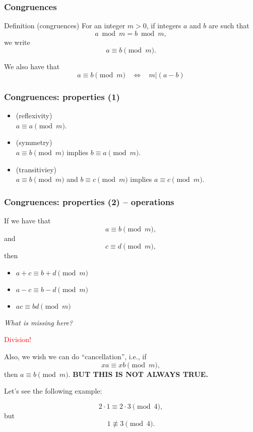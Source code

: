 \begin{frame}
  \frametitle{Congruences}

  \begin{block}{Definition (congruences)}
    For an integer $m>0$,
    if integers $a$ and $b$ are such that
    \[
    a \bmod m = b \bmod m,
    \]
    we write
    \[
    a \equiv b \pmod m.
    \]
  \end{block}

  \pause

  We also have that
  \[
  a \equiv b \pmod m \ \ \ \ \Leftrightarrow \ \ \ \
  m|(a-b)
  \]
\end{frame}

\begin{frame}
  \frametitle{Congruences: properties (1)}

  \begin{itemize}
  \item (reflexivity) \\
    $a\equiv a \pmod m$.
  \item (symmetry) \\
    $a\equiv b \pmod m$ implies $b\equiv a \pmod m$.
  \item (transitiviey) \\
    $a\equiv b \pmod m$ and $b \equiv c \pmod m$ implies $a \equiv c\pmod m$.
  \end{itemize}
\end{frame}
\begin{frame}
  \frametitle{Congruences: properties (2) -- operations}

  If we have that
  \[
  a \equiv b \pmod m,
  \]
  and
  \[
  c \equiv d \pmod m,
  \]
  then
  
  \begin{itemize}
  \item $a+c \equiv b+d \pmod m$
  \item $a-c \equiv b-d \pmod m$
  \item $ac \equiv bd \pmod m$
  \end{itemize}

  \pause

  {\em What is missing here?}
  \pause

  \textcolor{red}{Division!}

\end{frame}

\begin{frame}
  Also, we wish we can do ``cancellation'', i.e., if
  \[
  xa \equiv xb \pmod m,
  \]
  then $a \equiv b \pmod m$.  {\bf BUT THIS IS NOT ALWAYS TRUE.}
  
  \pause

  Let's see the following example:

  \[
  2\cdot 1 \equiv 2\cdot 3 \pmod 4,
  \]
  but
  \[
  1 \not\equiv 3\pmod 4.
  \]
\end{frame}

